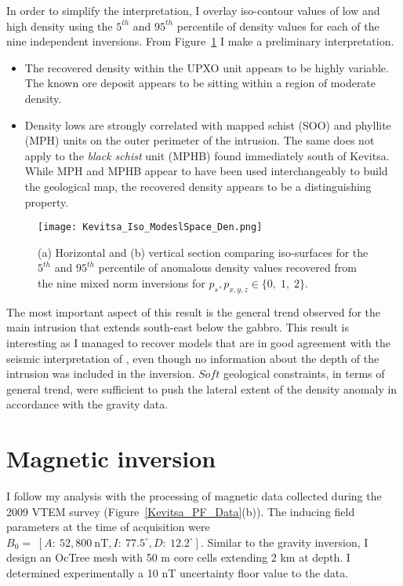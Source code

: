 In order to simplify the interpretation, I overlay iso-contour values of low and high density using the $5^{th}$ and $95^{th}$ percentile of density values for each of the nine independent inversions. From Figure~\ref{KevitsaIsoDensity} I make a preliminary interpretation.
\begin{itemize}
\item The recovered density within the UPXO unit appears to be highly variable. The known ore deposit appears to be sitting within a region of moderate density.
\item Density lows are strongly correlated with mapped schist (SOO) and phyllite (MPH) units on the outer perimeter of the intrusion. The same does not apply to the \emph{black schist} unit (MPHB) found immediately south of Kevitsa. While MPH and MPHB appear to have been used interchangeably to build the geological map, the recovered density appears to be a distinguishing property.
\end{itemize}
\begin{figure}
\texttt{[image: Kevitsa\_Iso\_ModeslSpace\_Den.png]}
\caption{(a) Horizontal and (b) vertical section comparing iso-surfaces for the $5^{th}$ and $95^{th}$ percentile of anomalous density values recovered from the nine mixed norm inversions for $p_s,p_{x,y,z} \in \{0,\; 1,\; 2\}$.}
\label{KevitsaIsoDensity}
\end{figure}
The most important aspect of this result is the general trend observed for the main intrusion that extends south-east below the gabbro. This result is interesting as I managed to recover models that are in good agreement with the seismic interpretation of \cite{Koivisto2015}, even though no information about the depth of the intrusion was included in the inversion. $Soft$ geological constraints, in terms of general trend, were sufficient to push the lateral extent of the density anomaly in accordance with the gravity data.

\section{Magnetic inversion}
I follow my analysis with the processing of magnetic data collected during the 2009 VTEM survey (Figure~\ref{Kevitsa_PF_Data}(b)). The inducing field parameters at the time of acquisition were $B_0 =\;[A:\:52,800\: \text{nT}, I:\:77.5^\circ, D:\:12.2^\circ]$.
Similar to the gravity inversion, I design an OcTree mesh with 50 m core cells extending 2 km at depth. I determined experimentally a 10 nT uncertainty floor value to the data.

